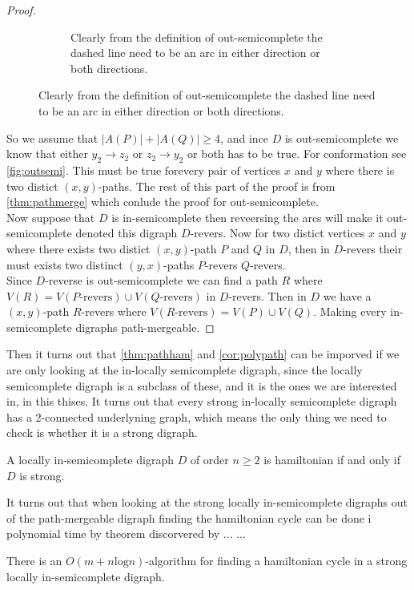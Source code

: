 \begin{proof}
\begin{figure}
\begin{subfigure}{0.60\textwidth}
            \caption{Clearly from the definition of out-semicomplete the dashed line need to be an arc in either direction or both directions.}
            \label{fig:outsemi}
        \end{subfigure}
    \end{figure}
    So we assume that $|A(P)|+|A(Q)|\geq 4$, and ince $D$ is out-semicomplete we know that either $y_2\rightarrow z_2$ or $z_2\rightarrow y_2$ or both has to be true. For conformation see \autoref{fig:outsemi}.
    This must be true forevery pair of vertices $x$ and $y$ where there is two distict $(x,y)$-paths. The rest of this part of the proof is from \autoref{thm:pathmerge} which conlude the proof for out-semicomplete.\\

    Now suppose that $D$ is in-semicomplete then reveersing the arcs will make it out-semicomplete denoted this digraph $D$-revers. 
    Now for two distict vertices $x$ and $y$ where there exists two distict $(x,y)$-path $P$ and $Q$ in $D$, then in $D$-revers their must exists two distinct $(y,x)$-paths $P$-revers $Q$-revers. \\
    Since $D$-reverse is out-semicomplete we can find a path $R$ where $V(R)=V(P\text{-revers}) \cup V(Q\text{-revers})$ in $D$-revers. 
    Then in $D$ we have a $(x,y)$-path $R$-revers where $V(R\text{-revers})=V(P)\cup V(Q)$. 
    Making every in-semicomplete digraphs path-mergeable.   
\end{proof}


Then it turns out that \autoref{thm:pathham} and \autoref{cor:polypath} can be imporved if we are only looking at the in-locally semicomplete digraph, since the locally semicomplete digraph is a subclass of these, and it is the ones we are interested in, in this thises. 
It turns out that every strong in-locally semicomplete digraph has a 2-connected underlyning graph, which means the only thing we need to check is whether it is a strong digraph.
\begin{thm}
    A locally in-semicomplete digraph $D$ of order $n\geq 2$ is hamiltonian if and only if $D$ is strong.
\end{thm}

It turns out that when looking at the strong locally in-semicomplete digraphs out of the path-mergeable digraph finding the hamiltonian cycle can be done i polynomial time by theorem discorvered by ... ...
\begin{thm}
    There is an $O(m+n\text{log}n)$-algorithm for finding a hamiltonian cycle in a strong locally in-semicomplete digraph.
\end{thm}

